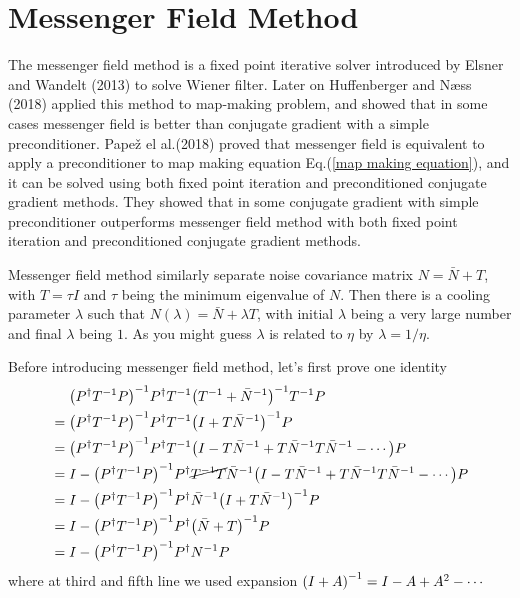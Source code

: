 \documentclass[11pt, letterpaper]{article}
\newcommand{\inv}[1]{#1^{-1}}
\newcommand{\Pdagger}{P^{\dagger}}
\newcommand{\Nbar}{\bar{N}}
\newcommand{\PPinv}[1]{\inv{\qty(\Pdagger #1 P)}}
\begin{document}
\section{Messenger Field Method}
The messenger field method is a fixed point iterative solver introduced by
Elsner and Wandelt (2013) \cite{2013A&A...549A.111E} to solve Wiener filter.
Later on Huffenberger and N{\ae}ss (2018) \cite{Huffenberger_2018} applied this
method to map-making problem, and showed that in some cases messenger field is
better than conjugate gradient with a simple preconditioner.
 Pape\v{z} el al.(2018) \cite{2018A&A...620A..59P} proved that messenger
field is equivalent to apply a preconditioner to map making equation
Eq.(\ref{map making equation}), and it can be solved using both fixed point
iteration and preconditioned conjugate gradient methods.
They showed that in some conjugate gradient with simple preconditioner
outperforms messenger field method with both fixed point iteration and
preconditioned conjugate gradient methods.

Messenger field method similarly separate noise covariance matrix
$N = \Nbar + T$, with $T = \tau I $ and $\tau$ being the minimum eigenvalue of
$N$.
Then there is a cooling parameter $\lambda$ such that 
$N(\lambda) = \Nbar + \lambda T$, with initial $\lambda$ being a very large
number and final $\lambda$ being $1$.
As you might guess $\lambda$ is related to $\eta$ by $\lambda = 1/\eta$.

Before introducing messenger field method, let's first prove one identity
\begin{align}
\begin{aligned}[b]
&\mathrel{\phantom{=}}
\PPinv{\inv{T}} \Pdagger \inv{T} \inv{\qty(\inv{T} + \inv{\Nbar})} \inv{T} P
\\
&= \PPinv{\inv{T}} \Pdagger \inv{T} \inv{\qty(I + T\inv{\Nbar})}  P
\\
&= \PPinv{\inv{T}} \Pdagger \inv{T}
    \qty(I - T\inv{\Nbar}+ T\inv{\Nbar}T\inv{\Nbar} - \cdots) P
\\
&= I - \PPinv{\inv{T}} \Pdagger \cancel{\inv{T}T} \inv{\Nbar} 
    \qty(I - T\inv{\Nbar} + T\inv{\Nbar}T\inv{\Nbar} - \cdots)P
\\
&= I - \PPinv{\inv{T}} \Pdagger \inv{\Nbar} \inv{\qty(I + T\inv{\Nbar})} P
\\
&= I - \PPinv{\inv{T}} \Pdagger \inv{\qty(\Nbar + T)} P
\\
&= I - \PPinv{\inv{T}} \Pdagger \inv{N} P \label{MF identity}
\end{aligned}
\end{align}
where at third and fifth line we used expansion
$\inv{\qty(I + A)} = I - A + A^2 - \cdots $
\end{document}
